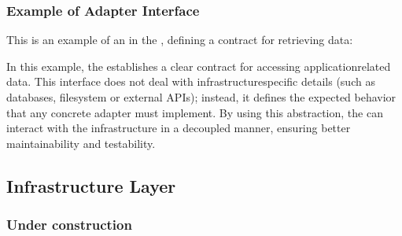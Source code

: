 \documentclass[letterpaper,10pt,english]{sphinxhowto}
\begin{document}
\subsubsection{Example of Adapter Interface}
\label{\detokenize{architecture/domain/index:example-of-adapter-interface}}
\sphinxAtStartPar
This is an example of an  in the , defining a contract for retrieving  data:

\begin{sphinxVerbatim}[commandchars=\\\{\}]
  

 


      
\end{sphinxVerbatim}

\sphinxAtStartPar
In this example, the  establishes a clear contract for accessing application\sphinxhyphen{}related data.
This interface does not deal with infrastructure\sphinxhyphen{}specific details (such as databases, filesystem or external APIs); instead, it defines the expected behavior that any concrete adapter must implement.
By using this abstraction, the  can interact with the infrastructure in a decoupled manner, ensuring better maintainability and testability.

\sphinxstepscope


\subsection{Infrastructure Layer}
\label{\detokenize{architecture/infrastructure/index:infrastructure-layer}}\label{\detokenize{architecture/infrastructure/index::doc}}

\subsubsection{Under construction}
\label{\detokenize{architecture/infrastructure/index:under-construction}}
\sphinxstepscope
\end{document}
